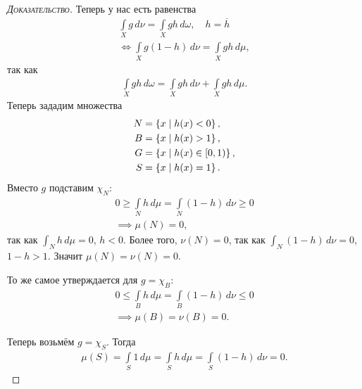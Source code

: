 \begin{proof}[\normalfont\textsc{Доказательство}]
Теперь у нас есть равенства \begin{align*}
 \int\limits_{X} g \, d\nu = \int\limits_{X} gh \, d\omega, \quad h = \overline{h}    \\
\iff \int\limits_{X} g(1 - h) \, d\nu = \int\limits_{X} gh \, d\mu    
,\end{align*} так как
\begin{align*}
 \int\limits_{X} gh \, d\omega = \int\limits_{X} gh \, d\nu + \int\limits_{X} gh \, d\mu      
.\end{align*} Теперь зададим множества \begin{align*}
 N &= \left\{ x \;\middle|\; h(x) < 0 \right\}, \\
 B &= \left\{ x \mid h(x) > 1 \right\}, \\
 G &= \left\{ x \;\middle|\; h(x) \in [0, 1) \right\}, \\
 S &= \left\{ x \;\middle|\; h(x) = 1 \right\}
.\end{align*} Вместо $g$ подставим $\chi_N$:
 \begin{align*}
 0 \geqslant \int\limits_{N} h \, d\mu  = \int\limits_{N} (1-h) \, d\nu   \geqslant 0 \\
 \implies \mu(N) = 0
,\end{align*} так как $\int_{N} h \, d\mu  = 0$, $h < 0$. Более того, $\nu(N) = 0$, так как  $\int_{N} (1-h) \, d\nu = 0 $, $1 - h > 1$. Значит  $\mu(N) = \nu(N) = 0$.

То же самое утверждается для $g = \chi_B$: \begin{align*}
 0 \leqslant \int\limits_{B} h \, d\mu = \int\limits_{B} (1-h) \, d\nu    \leqslant 0 \\
 \implies \mu(B) = \nu(B) = 0
.\end{align*} 

Теперь возьмём $g = \chi_S$. Тогда \begin{align*}
 \mu(S) = \int\limits_{S} 1 \, d\mu = \int\limits_{S} h \, d\mu = \int\limits_{S} (1-h) \, d\nu = 0    
.\end{align*}


\end{proof}
